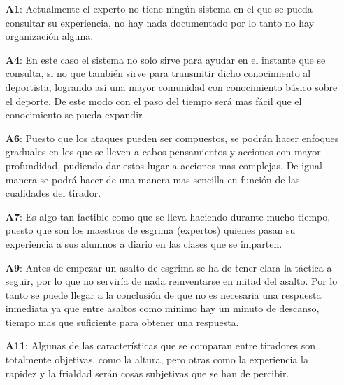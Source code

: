 \begin{enumerate}
  \item[\textbf{A1}:] Actualmente el experto no tiene ningún sistema en el que
     se pueda consultar su experiencia, no hay nada documentado por lo tanto no
     hay organización alguna.
  \item[\textbf{A4}:] En este caso el sistema no solo sirve para ayudar en el
     instante que se consulta, si no que también sirve para transmitir dicho
     conocimiento al deportista, logrando así una mayor comunidad con
     conocimiento básico sobre el deporte. De este modo con el paso del tiempo
     será mas fácil que el conocimiento se pueda expandir
  \item[\textbf{A6}:] Puesto que los ataques pueden ser compuestos, se podrán
     hacer enfoques graduales en los que se lleven a cabos pensamientos y
     acciones con mayor profundidad, pudiendo dar estos lugar a acciones mas
     complejas. De igual manera se podrá hacer de una manera mas sencilla
     en función de las cualidades del tirador.
  \item[\textbf{A7}:] Es algo tan factible como que se lleva haciendo durante
     mucho tiempo, puesto que son los maestros de esgrima (expertos) quienes
     pasan su experiencia a sus alumnos a diario en las clases que se imparten.
  \item[\textbf{A9}:] Antes de empezar un asalto de esgrima se ha de tener
     clara la táctica a seguir, por lo que no serviría de nada reinventarse
     en mitad del asalto. Por lo tanto se puede llegar a la conclusión de que
     no es necesaria una respuesta inmediata ya que entre asaltos como mínimo
     hay un minuto de descanso, tiempo mas que suficiente para obtener una respuesta.
  \item[\textbf{A11}:] Algunas de las características que se comparan entre
     tiradores son totalmente objetivas, como la altura, pero otras como la experiencia
     la rapidez y la frialdad serán cosas subjetivas que se han de percibir.
\end{enumerate}

